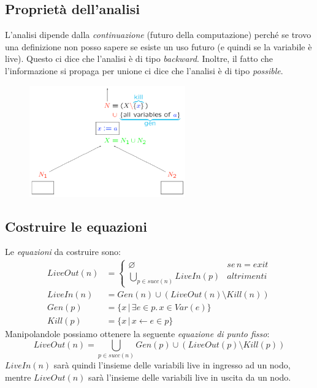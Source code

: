 \documentclass[a4paper,oneside,titlepage]{book}
\begin{document}
\subsection{Proprietà dell'analisi}
L'analisi dipende dalla \textit{continuazione} (futuro della computazione) perché se trovo una definizione non posso sapere se esiste un uso futuro (e quindi se la variabile è live). Questo ci dice che l'analisi è di tipo \textit{backward}. Inoltre, il fatto che l'informazione si propaga per unione ci dice che l'analisi è di tipo \textit{possible}.
\begin{figure}[htp]
	\centering
	\includegraphics[width=0.6\textwidth]{liveProp.png}
\end{figure}

\subsection{Costruire le equazioni}
\label{live2}
Le \textit{equazioni} da costruire sono:
\begin{align*}
	LiveOut(n) &=
	\begin{cases}
		\varnothing & se \, n=exit \\
		\bigcup_{p \in succ(n)} LiveIn(p) & altrimenti
	\end{cases} \\
	LiveIn(n) &= Gen(n) \cup (LiveOut(n) \setminus Kill(n)) \\
	Gen(p) &= \{ x \, | \, \exists e \in p. \, x \in Var(e) \} \\
    Kill(p) &= \{ x \, | \, x \leftarrow e \in p \}
\end{align*}
Manipolandole possiamo ottenere la seguente \textit{equazione di punto fisso}:
\[ LiveOut(n) = \bigcup_{p\in succ(n)} Gen(p) \cup (LiveOut(p) \setminus Kill(p)) \]
$LiveIn(n)$ sarà quindi l'insieme delle variabili live in ingresso ad un nodo, mentre $LiveOut(n)$ sarà l'insieme delle variabili live in uscita da un nodo.
\end{document}
